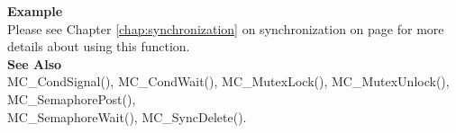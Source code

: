 \noindent
{\bf Example}\\
\noindent
Please see Chapter \ref{chap:synchronization} on synchronization on page
\pageref{chap:synchronization} for more details about using this function.\\

\noindent
{\bf See Also}\\
MC\_CondSignal(), MC\_CondWait(), MC\_MutexLock(), MC\_MutexUnlock(), MC\_SemaphorePost(),\\ MC\_SemaphoreWait(), MC\_SyncDelete().\\

